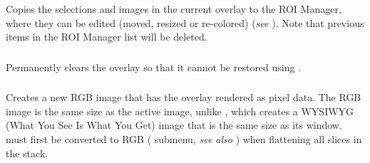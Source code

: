 Copies the selections and images in the
current overlay to the ROI Manager, where they can be edited (moved,
resized or re-colored) (\emph{see} ).
Note that previous items in the ROI Manager list will be deleted.


\subsubsection{\protect{}\label{sub:Remove-Overlay}}

Permanently clears the overlay so that it cannot be restored using
.


\subsubsection{\protect{}\label{sub:Flatten-[F]}}

Creates a new RGB image that has the overlay rendered as pixel data.
The RGB image is the same size as the active image, unlike ,
which creates a WYSIWYG
(What You See Is What You Get) image that is the same size as its
window.  must first be
converted to RGB (
submenu, \emph{see also} ) when flattening
all slices in the stack.


\subsubsection[\protect\userinterface{Labels\ldots{}}]{\protect{}\label{sub:Labels...}}

